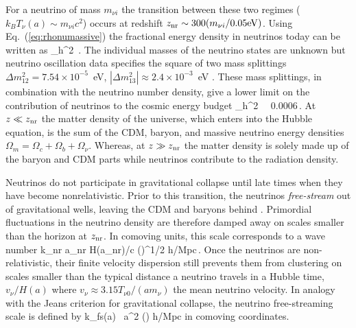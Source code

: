 For a neutrino of mass $m_{\nu i}$ the transition between these two regimes ($k_B T_\nu(a) \sim m_{\nu i} c^2$) occurs at redshift $z_{\rm nr} \sim 300 (m_{\nu i}/0.05 {\rm eV})$. Using Eq.~(\ref{eq:rhonumassive}) the fractional energy density in neutrinos today can be written as
\beq
\Omega_\nu h^2 \approx {}\,.
\eeq
The individual masses of the neutrino states are unknown but neutrino oscillation data specifies the square of two mass splittings $\Delta m_{12}^2 = 7.54 \times 10^{-5}$~eV, $|\Delta m_{13}^2|\approx 2.4 \times 10^{-3}$~eV \cite{Agashe:2014kda}. These mass splittings, in combination with the neutrino number density, give a lower limit on the contribution of neutrinos to the cosmic energy budget
\beq
\Omega_\nu h^2 \,  \gtrsim \, 0.0006\,.
\eeq
At $z \ll z_{\rm nr}$ the matter density of the universe, which enters into the Hubble equation, is the sum of the CDM, baryon, and massive neutrino energy densities $\Omega_m = \Omega_c + \Omega_b + \Omega_\nu$. Whereas, at $z\gg z_{\rm nr}$ the matter density is solely made up of the baryon and CDM parts while neutrinos contribute to the radiation density. 

Neutrinos do not participate in gravitational collapse until late times when they have become nonrelativistic. Prior to this transition, the neutrinos {\em free-stream} out of gravitational wells, leaving the CDM and baryons behind  \cite{Bond:1983hb, Ma:1996za, Hu:1997vi, Hu:1997mj}. Primordial fluctuations in the neutrino density are therefore damped away on scales smaller than the horizon at $z_{\rm nr}$. In comoving units, this scale corresponds to a wave number
\beq
k_{\rm nr} \equiv a_{\rm nr} H(a_{\rm nr})/c  \left(\right)^{1/2} h/{\rm Mpc}\,.
\eeq
Once the neutrinos are non-relativistic, their finite velocity dispersion still prevents them from clustering on scales smaller than the typical distance a neutrino travels in a Hubble time, $v_\nu /H(a)$ where $v_\nu \approx 3.15 T_{\nu 0}/(a m_\nu)$ the mean neutrino velocity. In analogy with the Jeans criterion for gravitational collapse, the neutrino free-streaming scale is defined by \cite{Bond:1983hb, Lesgourgues:2006nd}
\beq
k_{\rm fs}(a) \equiv {} \, a^2 \left(\right) h/{\rm Mpc}
\eeq
in comoving coordinates. 

